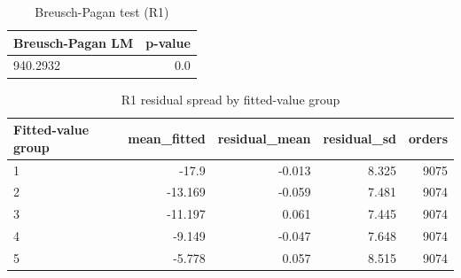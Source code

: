 \begin{table}[htbp]
\centering
\small
\caption{Breusch-Pagan test (R1)}
\begin{tabular}{lr}
\toprule
Breusch-Pagan LM & p-value \\
\midrule
940.2932 & 0.0 \\
\bottomrule
\end{tabular}
\par\smallskip\begin{minipage}{\linewidth}\footnotesize \end{minipage}
\end{table}


\begin{table}[htbp]
\centering
\small
\caption{R1 residual spread by fitted-value group}
\begin{tabular}{lrrrr}
\toprule
Fitted-value group & mean\_fitted & residual\_mean & residual\_sd & orders \\
\midrule
1 & -17.9 & -0.013 & 8.325 & 9075 \\
2 & -13.169 & -0.059 & 7.481 & 9074 \\
3 & -11.197 & 0.061 & 7.445 & 9074 \\
4 & -9.149 & -0.047 & 7.648 & 9074 \\
5 & -5.778 & 0.057 & 8.515 & 9074 \\
\bottomrule
\end{tabular}
\par\smallskip\begin{minipage}{\linewidth}\footnotesize \end{minipage}
\end{table}

